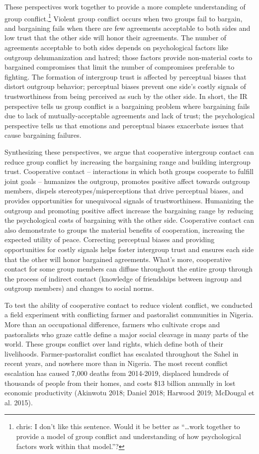 \documentclass[11pt]{article}
\begin{document}
These perspectives work together to provide a more complete
understanding of group conflict.\footnote{chris: I don't like this
  sentence. Would it be better as ``\ldots{}work together to provide a
  model of group conflict and understanding of how psychological factors
  work within that model.''?} Violent group conflict occurs when two
groups fail to bargain, and bargaining fails when there are few
agreements acceptable to both sides and low trust that the other side
will honor their agreements. The number of agreements acceptable to both
sides depends on psychological factors like outgroup dehumanization and
hatred; those factors provide non-material costs to bargained
compromises that limit the number of compromises preferable to fighting.
The formation of intergroup trust is affected by perceptual biases that
distort outgroup behavior; perceptual biases prevent one side's costly
signals of trustworthiness from being perceived as such by the other
side. In short, the IR perspective tells us group conflict is a
bargaining problem where bargaining fails due to lack of
mutually-acceptable agreements and lack of trust; the psychological
perspective tells us that emotions and perceptual biases exacerbate
issues that cause bargaining failures.

Synthesizing these perspectives, we argue that cooperative intergroup
contact can reduce group conflict by increasing the bargaining range and
building intergroup trust. Cooperative contact -- interactions in which
both groups cooperate to fulfill joint goals -- humanizes the outgroup,
promotes positive affect towards outgroup members, dispels
stereotypes/misperceptions that drive perceptual biases, and provides
opportunities for unequivocal signals of trustworthiness. Humanizing the
outgroup and promoting positive affect increase the bargaining range by
reducing the psychological costs of bargaining with the other side.
Cooperative contact can also demonstrate to groups the material benefits
of cooperation, increasing the expected utility of peace. Correcting
perceptual biases and providing opportunities for costly signals helps
foster intergroup trust and ensures each side that the other will honor
bargained agreements. What's more, cooperative contact for some group
members can diffuse throughout the entire group through the process of
indirect contact (knowledge of friendships between ingroup and outgroup
members) and changes to social norms.

To test the ability of cooperative contact to reduce violent conflict,
we conducted a field experiment with conflicting farmer and pastoralist
communities in Nigeria. More than an occupational difference, farmers
who cultivate crops and pastoralists who graze cattle define a major
social cleavage in many parts of the world. These groups conflict over
land rights, which define both of their livelihoods. Farmer-pastoralist
conflict has escalated throughout the Sahel in recent years, and nowhere
more than in Nigeria. The most recent conflict escalation has caused
7,000 deaths from 2014-2019, displaced hundreds of thousands of people
from their homes, and costs \$13 billion annually in lost economic
productivity (Akinwotu 2018; Daniel 2018; Harwood 2019; McDougal et al.
2015).
\end{document}
